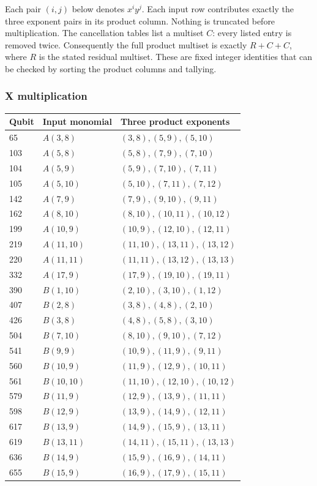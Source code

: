 \documentclass{article}
\begin{document}
Each pair \((i,j)\) below denotes \(x^i y^j\). Each input row contributes exactly
the three exponent pairs in its product column. Nothing is truncated before
multiplication. The cancellation tables list a multiset \(C\): every listed
entry is removed twice. Consequently the full product multiset is exactly
\(R + C + C\), where \(R\) is the stated residual multiset. These are fixed integer
identities that can be checked by sorting the product columns and tallying.

\subsubsection{X multiplication}\label{app:witness-x}

\begin{longtable}{lll}
  Qubit & Input monomial & Three product exponents \\
  \hline
  \endhead
  65 & \(A(3, 8)\) & \((3, 8), (5, 9), (5, 10)\) \\
  103 & \(A(5, 8)\) & \((5, 8), (7, 9), (7, 10)\) \\
  104 & \(A(5, 9)\) & \((5, 9), (7, 10), (7, 11)\) \\
  105 & \(A(5, 10)\) & \((5, 10), (7, 11), (7, 12)\) \\
  142 & \(A(7, 9)\) & \((7, 9), (9, 10), (9, 11)\) \\
  162 & \(A(8, 10)\) & \((8, 10), (10, 11), (10, 12)\) \\
  199 & \(A(10, 9)\) & \((10, 9), (12, 10), (12, 11)\) \\
  219 & \(A(11, 10)\) & \((11, 10), (13, 11), (13, 12)\) \\
  220 & \(A(11, 11)\) & \((11, 11), (13, 12), (13, 13)\) \\
  332 & \(A(17, 9)\) & \((17, 9), (19, 10), (19, 11)\) \\
  390 & \(B(1, 10)\) & \((2, 10), (3, 10), (1, 12)\) \\
  407 & \(B(2, 8)\) & \((3, 8), (4, 8), (2, 10)\) \\
  426 & \(B(3, 8)\) & \((4, 8), (5, 8), (3, 10)\) \\
  504 & \(B(7, 10)\) & \((8, 10), (9, 10), (7, 12)\) \\
  541 & \(B(9, 9)\) & \((10, 9), (11, 9), (9, 11)\) \\
  560 & \(B(10, 9)\) & \((11, 9), (12, 9), (10, 11)\) \\
  561 & \(B(10, 10)\) & \((11, 10), (12, 10), (10, 12)\) \\
  579 & \(B(11, 9)\) & \((12, 9), (13, 9), (11, 11)\) \\
  598 & \(B(12, 9)\) & \((13, 9), (14, 9), (12, 11)\) \\
  617 & \(B(13, 9)\) & \((14, 9), (15, 9), (13, 11)\) \\
  619 & \(B(13, 11)\) & \((14, 11), (15, 11), (13, 13)\) \\
  636 & \(B(14, 9)\) & \((15, 9), (16, 9), (14, 11)\) \\
  655 & \(B(15, 9)\) & \((16, 9), (17, 9), (15, 11)\) \\
\end{longtable}
\end{document}
